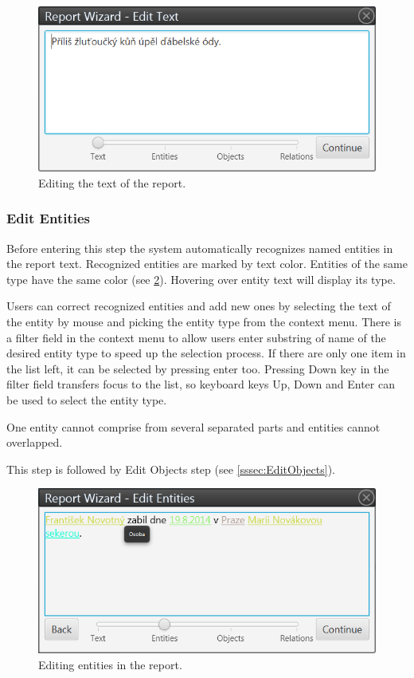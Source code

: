 \documentclass[12pt,a4paper]{report}
\begin{document}
\begin{figure}[!htb]
        \centering
        \includegraphics[width=\textwidth]{Images/reportedit}
        \caption{Editing the text of the report.}
        \label{fig:ReportEdit}
\end{figure}

\subsubsection{Edit Entities}
\label{sssec:EditEntities}

Before entering this step the system automatically recognizes named entities
in the report text. Recognized entities are marked by text color. Entities of
the same type have the same color (see \ref{fig:Entities}). Hovering over entity
text will display its type.

Users can correct recognized entities and add new ones by selecting the text
of the entity by mouse and picking the entity type from the context menu.
There is a filter field in the context menu to allow users enter substring of
name of the desired entity type to speed up the selection process. If there are
only one item in the list left, it can be selected by pressing enter too.
Pressing Down key in the filter field transfers focus to the list, so keyboard keys Up, Down and Enter can be used to select the entity type.

One entity cannot comprise from several separated parts and entities cannot
overlapped.

This step is followed by Edit Objects step (see \ref{sssec:EditObjects}).

\begin{figure}[!htb]
        \centering
        \includegraphics[width=\textwidth]{Images/entities}
        \caption{Editing entities in the report.}
        \label{fig:Entities}
\end{figure}
\end{document}
